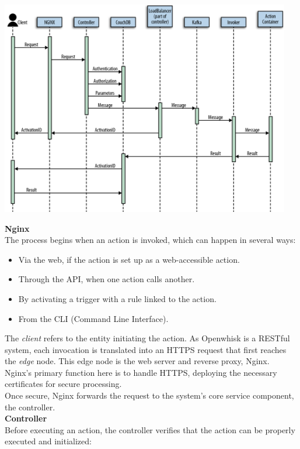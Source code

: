 \begin{center}
    \includegraphics[width=0.95\textwidth]{img/sequence.png}
    \vspace{10pt}
\end{center}
\textbf{Nginx}\\
The process begins when an action is invoked, which can happen in several ways:
\begin{itemize}
    \item Via the web, if the action is set up as a web-accessible action.
    \item Through the API, when one action calls another.
    \item By activating a trigger with a rule linked to the action.
    \item From the CLI (Command Line Interface).
\end{itemize}
The \textit{client} refers to the entity initiating the action. As Openwhisk is a RESTful system, each invocation is translated into an HTTPS request that first reaches the \textit{edge} node. This edge node is the web server and reverse proxy, Nginx.\\
Nginx’s primary function here is to handle HTTPS, deploying the necessary certificates for secure processing.\\
Once secure, Nginx forwards the request to the system's core service component, the controller.\vspace{70pt}\\
\textbf{Controller}\\
Before executing an action, the controller verifies that the action can be properly executed and initialized:
